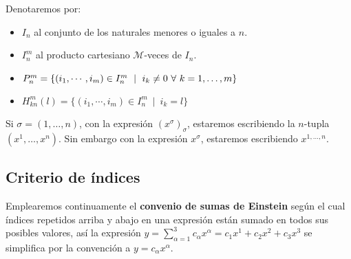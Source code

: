 \begin{notation}
  Denotaremos por:
  \begin{itemize}
    \item $I_n$ al conjunto de los naturales menores o iguales a $n$.
    \item $I_n^m$ al producto cartesiano $\mathcal{M}$-veces de $I_n$.
    \item $P_n^m=\{(i_1,\cdots,i_m)\in I_n^m\ \mid \ i_k\neq 0\ \forall\ \indexdots{k}{1}{m}\}$
    \item $H_{kn}^m(l)=\{(i_1,\cdots,i_m)\in I_n^m\ \mid \ i_k=l\}$
  \end{itemize}
\end{notation}

\begin{notation}
  Si $\sigma=(1,\ldots,n)$, con la expresión $(x^\sigma)_\sigma$, estaremos escribiendo la $n$-tupla $(x^1,\ldots,
  x^n)$.
  Sin embargo con la expresión $x^\sigma$, estaremos escribiendo $x^{1,\ldots,n}$.
\end{notation}

\subsection{Criterio de índices}\label{subsec:criterio-de-indices}

Emplearemos continuamente el \textbf{convenio de sumas de Einstein} según el cual
índices repetidos arriba y abajo en una expresión están sumado en todos sus posibles valores,
así la expresión $y=\sum_{\alpha=1}^3 c_\alpha x^\alpha=c_1 x^1 + c_2 x^2 + c_3 x^3$
se simplifica por la convención a $y = c_\alpha x^\alpha$.
